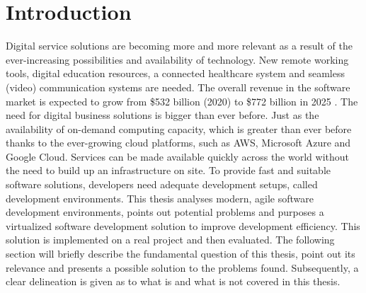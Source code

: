 
\section{Introduction}\label{sec::intro}
Digital service solutions are becoming more and more relevant as a result of the ever-increasing possibilities and availability of technology. New remote working tools, digital education resources, a connected healthcare system and seamless (video) communication systems are needed. The overall revenue in the software market is expected to grow from \$532 billion (2020) to \$772 billion in 2025 \cite{software_industry_groth}. The need for digital business solutions is bigger than ever before. Just as the availability of on-demand computing capacity, which is greater than ever before thanks to the ever-growing cloud platforms, such as \ac{AWS}, Microsoft Azure and Google Cloud. Services can be made available quickly across the world without the need to build up an infrastructure on site. To provide fast and suitable software solutions, developers need adequate development setups, called development environments. This thesis analyses modern, agile software development environments, points out potential problems and purposes a virtualized software development solution to improve development efficiency. This solution is implemented on a real project and then evaluated.\newline
The following section will briefly describe the fundamental question of this thesis, point out its relevance and presents a possible solution to the problems found. Subsequently, a clear delineation is given as to what is and what is not covered in this thesis.

